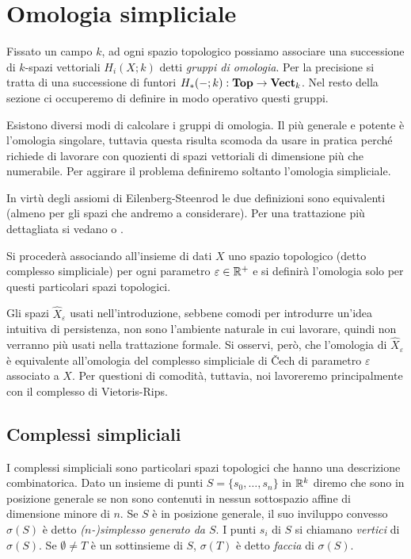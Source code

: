 \clearpage

\section{Omologia simpliciale}

\begin{sloppypar}
  Fissato un campo $k$, ad ogni spazio topologico possiamo associare una successione di $k$-spazi vettoriali $H_i(X;k)$ detti \emph{gruppi di omologia}. Per la precisione si tratta di una successione di funtori ${H_*(-;k):\mathbf{Top} \to \mathbf{Vect}_k}$. Nel resto della sezione ci occuperemo di definire in modo operativo questi gruppi.
\end{sloppypar}

Esistono diversi modi di calcolare i gruppi di omologia. Il più generale e potente è l'omologia singolare, tuttavia questa risulta scomoda da usare in pratica perché richiede di lavorare con quozienti di spazi vettoriali di dimensione più che numerabile. Per aggirare il problema definiremo soltanto l'omologia simpliciale.

In virtù degli assiomi di Eilenberg-Steenrod \cite{Eilenberg1945, Eilenberg} le due definizioni sono equivalenti (almeno per gli spazi che andremo a considerare). Per una trattazione più dettagliata si vedano \cite{Hatcher2015} o \cite{Rotman1988}.

Si procederà associando all'insieme di dati $X$ uno spazio topologico (detto complesso simpliciale) per ogni parametro $\varepsilon \in \mathbb{R}^+$ e si definirà l'omologia solo per questi particolari spazi topologici.

Gli spazi $\widehat{X}_\varepsilon$ usati nell'introduzione, sebbene comodi per introdurre un'idea intuitiva di persistenza, non sono l'ambiente naturale in cui lavorare, quindi non verranno più usati nella trattazione formale. Si osservi, però, che l'omologia di $\widehat{X}_\varepsilon$ è equivalente all'omologia del complesso simpliciale di \v{C}ech di parametro $\varepsilon$ associato a $X$. Per questioni di comodità, tuttavia, noi lavoreremo principalmente con il complesso di Vietoris-Rips.

\subsection{Complessi simpliciali}

\begin{sloppypar}
  I complessi simpliciali sono particolari spazi topologici che hanno una descrizione combinatorica. Dato un insieme di punti ${S=\{s_0,\dots,s_n\}}$ in $\mathbb{R}^k$ diremo che sono in posizione generale se non sono contenuti in nessun sottospazio affine di dimensione minore di $n$. Se $S$ è in posizione generale, il suo inviluppo convesso $\sigma(S)$ è detto \emph{($n$-)simplesso generato da $S$}. I punti $s_i$ di $S$ si chiamano \emph{vertici} di $\sigma(S)$. Se $\emptyset\neq T$ è un sottinsieme di $S$, $\sigma(T)$ è detto \emph{faccia} di $\sigma(S)$.
\end{sloppypar}

